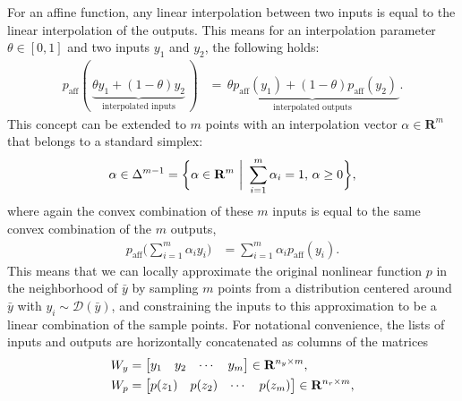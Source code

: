 For an affine function, any linear interpolation between two inputs is equal to the linear interpolation of the outputs. This means for an interpolation parameter $\theta \in [0, 1]$ and two inputs $y_1$ and $y_2$, the following holds:
\begin{align}
    p_\text{aff}(\,\underbrace{\theta y_1 + (1-\theta)y_2}_\text{interpolated inputs}\,) &= \underbrace{\,\theta p_\text{aff}(y_1) + (1 - \theta) p_\text{aff}(y_2)\,}_\text{interpolated outputs}.
\end{align}
This concept can be extended to $m$ points with an interpolation vector $\alpha \in \mathbf{R}^m$ that belongs to a standard simplex:
\begin{align}
    \alpha \in \Delta^{m-1} = \biggl\{  \alpha \in \mathbf{R}^{m} \,\,\bigg|\,\, \sum_{i=1}^m \alpha_i =1,\, \alpha \geq 0\biggl\},
\end{align}
where again the convex combination of these $m$ inputs is equal to the same convex combination of the $m$ outputs,
\begin{align}
    p_\text{aff}\bigg({\sum_{i=1}^m\alpha_i y_i}\bigg) &= {\sum_{i=1}^m \alpha_i p_\text{aff}(y_i)}.
\end{align}
This means that we can locally approximate the original nonlinear function $p$ in the neighborhood of $\bar{y}$ by sampling $m$ points from a distribution centered around $\bar{y}$ with $y_i \sim \mathcal{D}(\bar{y})$, and constraining the inputs to this approximation to be a linear combination of the sample points.  For notational convenience, the lists of inputs and outputs are horizontally concatenated as columns of the matrices 
\begin{align}
    W_y &= \begin{bmatrix}
        y_1 & y_2 & \cdots & y_m
    \end{bmatrix} \in \mathbf{R}^{n_y \times m}, \\
    W_p &= \begin{bmatrix}
        p(z_1) & p(z_2) & \cdots & p(z_m)
    \end{bmatrix} \in \mathbf{R}^{n_r \times m}, 
\end{align}
